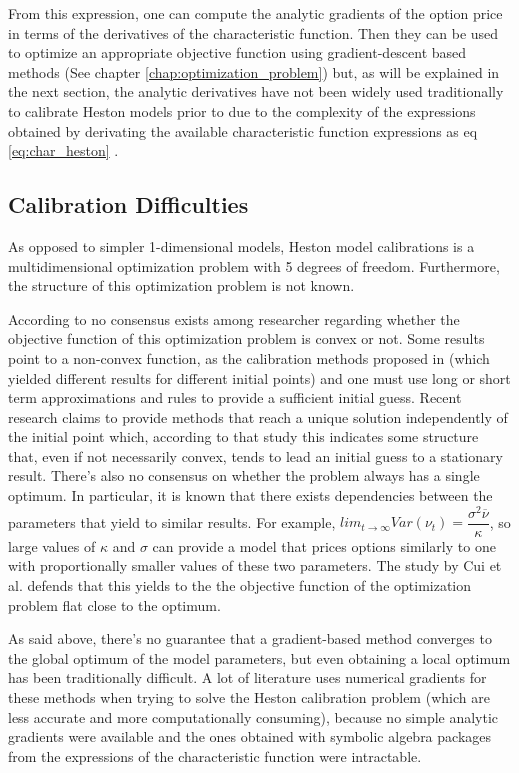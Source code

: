 \documentclass[12,twoside]{mammeTFM}
\theoremstyle{definition}
\theoremstyle{remark}
\begin{document}
From this expression, one can compute the analytic gradients of the option price in terms of the derivatives of the characteristic function. Then they can be used to optimize an appropriate objective function using gradient-descent based methods (See chapter \ref{chap:optimization_problem}) but, as will be explained in the next section, the analytic derivatives have not been widely used traditionally to calibrate Heston models prior to \cite{cui17} due to the complexity of the expressions obtained by derivating the available characteristic function expressions as eq \ref{eq:char_heston}  \cite{cui17}.

\subsection{Calibration Difficulties} \label{subsec:calibration_difficulties}
As opposed to simpler 1-dimensional models, Heston model calibrations is a multidimensional optimization problem with 5 degrees of freedom. Furthermore, the structure of this optimization problem is not known.

According to \cite{cui17} no consensus exists among researcher regarding whether the objective function of this optimization problem is convex or not. Some results point to a non-convex function, as the calibration methods proposed in \cite{che07, mik03} (which yielded different results for different initial points) and one must use long or short term approximations and rules to provide a sufficient initial guess. Recent research claims to provide methods that reach a unique solution independently of the initial point \cite{ger12} which, according to that study this indicates some structure that, even if not necessarily convex, tends to lead an initial guess to a stationary result.
There's also no consensus on whether the problem always has a single  optimum. In particular, it is known that there exists dependencies between the parameters that yield to similar results. For example, $lim_{t \rightarrow \infty} Var(\nu_t) = \dfrac{\sigma^2 \overline{\nu}}{\kappa}$, so large values of $\kappa$ and $\sigma$ can provide a model that prices options similarly to one with proportionally smaller values of these two parameters. The study by Cui et al. \cite{cui17} defends that this yields to the the objective function of the optimization problem flat close to the optimum.

As said above, there's no guarantee that a gradient-based method converges to the global optimum of the model parameters, but even obtaining a local optimum has been traditionally difficult. A lot of literature uses numerical gradients\cite{ger12} for these methods when trying to solve the Heston calibration problem (which are less accurate and more computationally consuming), because no simple analytic gradients were available and the ones obtained with symbolic algebra packages from the expressions of the characteristic function were intractable.
\end{document}

